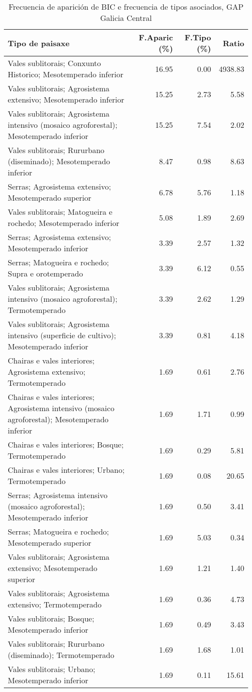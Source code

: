 \begin{table}[p]
\centering
\caption{Frecuencia de aparición de BIC e frecuencia de tipos asociados, GAP Galicia Central} 
\label{vbic7}
\begin{tabular}{lrrr}
  \hline
Tipo de paisaxe & F.Aparic (\%) & F.Tipo (\%) & Ratio \\ 
  \hline
Vales sublitorais; Conxunto Historico; Mesotemperado inferior & 16.95 & 0.00 & 4938.83 \\ 
  Vales sublitorais; Agrosistema extensivo; Mesotemperado inferior & 15.25 & 2.73 & 5.58 \\ 
  Vales sublitorais; Agrosistema intensivo (mosaico agroforestal); Mesotemperado inferior & 15.25 & 7.54 & 2.02 \\ 
  Vales sublitorais; Rururbano (diseminado); Mesotemperado inferior & 8.47 & 0.98 & 8.63 \\ 
  Serras; Agrosistema extensivo; Mesotemperado superior & 6.78 & 5.76 & 1.18 \\ 
  Vales sublitorais; Matogueira e rochedo; Mesotemperado inferior & 5.08 & 1.89 & 2.69 \\ 
  Serras; Agrosistema extensivo; Mesotemperado inferior & 3.39 & 2.57 & 1.32 \\ 
  Serras; Matogueira e rochedo; Supra e orotemperado & 3.39 & 6.12 & 0.55 \\ 
  Vales sublitorais; Agrosistema intensivo (mosaico agroforestal); Termotemperado & 3.39 & 2.62 & 1.29 \\ 
  Vales sublitorais; Agrosistema intensivo (superficie de cultivo); Mesotemperado inferior & 3.39 & 0.81 & 4.18 \\ 
  Chairas e vales interiores; Agrosistema extensivo; Termotemperado & 1.69 & 0.61 & 2.76 \\ 
  Chairas e vales interiores; Agrosistema intensivo (mosaico agroforestal); Mesotemperado inferior & 1.69 & 1.71 & 0.99 \\ 
  Chairas e vales interiores; Bosque; Termotemperado & 1.69 & 0.29 & 5.81 \\ 
  Chairas e vales interiores; Urbano; Termotemperado & 1.69 & 0.08 & 20.65 \\ 
  Serras; Agrosistema intensivo (mosaico agroforestal); Mesotemperado inferior & 1.69 & 0.50 & 3.41 \\ 
  Serras; Matogueira e rochedo; Mesotemperado superior & 1.69 & 5.03 & 0.34 \\ 
  Vales sublitorais; Agrosistema extensivo; Mesotemperado superior & 1.69 & 1.21 & 1.40 \\ 
  Vales sublitorais; Agrosistema extensivo; Termotemperado & 1.69 & 0.36 & 4.73 \\ 
  Vales sublitorais; Bosque; Mesotemperado inferior & 1.69 & 0.49 & 3.43 \\ 
  Vales sublitorais; Rururbano (diseminado); Termotemperado & 1.69 & 1.68 & 1.01 \\ 
  Vales sublitorais; Urbano; Mesotemperado inferior & 1.69 & 0.11 & 15.61 \\ 
   \hline
\end{tabular}
\end{table}
